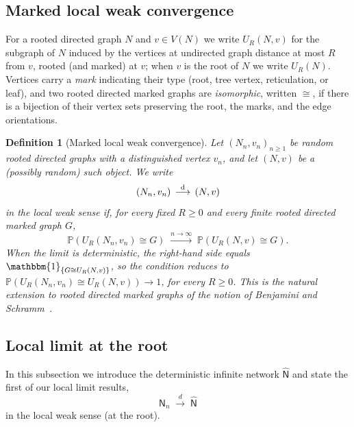 \documentclass[english,11pt]{smfart}
\newcommand{\Prb}[1]{\mathbb{P}\left(#1\right)}
\newcommand{\one}{{\mathbbm{1}}}
\newcommand{\convdis}{\,{\buildrel \mathrm{d} \over \longrightarrow}\,}
\newcommand{\mN}{\mathsf{N}}
\newtheorem{definition}[theorem]{Definition}
\numberwithin{equation}{section}
\begin{document}
\subsection{Marked local weak convergence}
\label{ssec:lwc}

For a rooted directed graph $N$ and $v\in V(N)$ we write $U_R(N,v)$ for the
subgraph of $N$ induced by the vertices at undirected graph distance at most
$R$ from $v$, rooted (and marked) at $v$; when $v$ is the root of $N$ we
write $U_R(N)$. Vertices carry a \emph{mark} indicating their type
(root, tree vertex, reticulation, or leaf), and two rooted directed marked
graphs are \emph{isomorphic}, written $\cong$, if there is a bijection of
their vertex sets preserving the root, the marks, and the edge orientations.

\begin{definition}[Marked local weak convergence]\label{def:lwc-marked}
Let $(N_n,v_n)_{n\ge 1}$ be random rooted directed graphs with a
distinguished vertex $v_n$, and let $(N,v)$ be a (possibly random) such
object. We write
\[
  (N_n,v_n)\;\convdis\;(N,v)
\]
in the \emph{local weak sense} if, for every fixed $R\ge 0$ and every
finite rooted directed marked graph $G$,
\[
  \Prb{U_R(N_n,v_n)\cong G}\;\xrightarrow{n\to\infty}\;\Prb{U_R(N,v)\cong G}.
\]
When the limit is deterministic, the right-hand side equals $\one_{\{G\cong
U_R(N,v)\}}$, so the condition reduces to
$\Prb{U_R(N_n,v_n)\cong U_R(N,v)}\to 1$, for every $R\ge 0$.
This is the natural extension to rooted directed marked graphs of the
notion of Benjamini and Schramm~\cite{MR1873300}.
\end{definition}

\FloatBarrier
\subsection{Local limit at the root}
\label{ssec:root}
In this subsection we introduce the deterministic infinite network
$\hat{\mN}$ and state the first of our local limit results,
\[
  \mN_n\;\xrightarrow{\;d\;}\;\hat{\mN}
\]
in the local weak sense (at the root).
\end{document}

